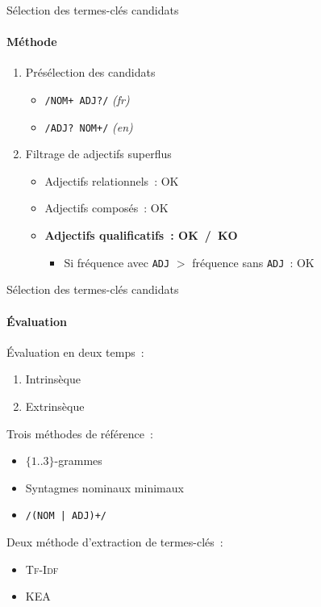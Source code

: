 \begin{frame}{Sélection des termes-clés candidats}\framesubtitle{Méthode}
  \begin{enumerate}
    \item{Présélection des candidats}
    \begin{itemize}
      \item{\texttt{/NOM+ ADJ?/} \textit{(fr)}}
      \item{\texttt{/ADJ? NOM+/} \textit{(en)}}
    \end{itemize}
    \item{Filtrage de adjectifs superflus}
    \begin{itemize}
      \item{Adjectifs relationnels~: OK}
      \item{Adjectifs composés~: OK}
      \item{\textbf{Adjectifs qualificatifs~: OK~/~KO}}
      \begin{itemize}
        \item{Si fréquence avec \texttt{ADJ} $>$ fréquence sans
                  \texttt{ADJ}~: OK}
      \end{itemize}
    \end{itemize}
  \end{enumerate}
\end{frame}

\begin{frame}{Sélection des termes-clés candidats}\framesubtitle{Évaluation}
  Évaluation en deux temps~:
  \begin{enumerate}
    \item{Intrinsèque}
    \item{Extrinsèque}
  \end{enumerate}

  \vspace{1em}

  Trois méthodes de référence~:
  \begin{itemize}
    \item{$\{1..3\}$-grammes}
    \item{Syntagmes nominaux minimaux}
    \item{\texttt{/(NOM | ADJ)+/}}
  \end{itemize}

  \vspace{1em}

  Deux méthode d'extraction de termes-clés~:
  \begin{itemize}
    \item{\textsc{Tf-Idf}}
    \item{KEA}
  \end{itemize}
\end{frame}

